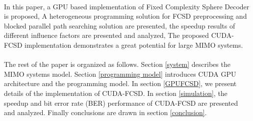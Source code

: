 \documentclass[12pt,a4paper,final]{article}
\begin{document}
\begin{spacing}{2.5}
\paragraph{}In this paper, a GPU based implementation of Fixed Complexity Sphere Decoder is proposed, A heterogeneous programming solution for FCSD preprocessing and blocked parallel path searching solution are presented, the speedup results of different influence factors are presented and analyzed, The proposed CUDA-FCSD implementation demonstrates a great potential for large MIMO systems.
\paragraph{}The rest of the paper is organized as follows. Section \ref{system} describes the MIMO systems model. Section \ref{programming model} introduces CUDA GPU architecture and the programming model. In section \ref{GPUFCSD}, we present details of the implementation of CUDA-FCSD. In section \ref{simulation}, the speedup and bit error rate (BER) performance of CUDA-FCSD are presented and analyzed. Finally conclusions are drawn in section \ref{conclusion}.    

\end{spacing}
\end{document}
